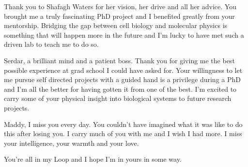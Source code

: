 Thank you to Shafagh Waters for her vision, her drive and all her advice. You brought me a truly fascinating PhD project and I benefited greatly from your mentorship. Bridging the gap between cell biology and molecular physics is something that will happen more in the future and I'm lucky to have met such a driven lab to teach me to do so. 

Serdar, a brilliant mind and a patient boss. Thank you for giving me the best possible experience at grad school I could have asked for. Your willingness to let me pursue self directed projects with a guided hand is a privilege during a PhD and I'm all the better for having gotten it from one of the best. I'm excited to carry some of your physical insight into biological systems to future research projects. 

Maddy, I miss you every day. You couldn't have imagined what it was like to do this after losing you. I carry much of you with me and I wish I had more. I miss your intelligence, your warmth and your love.

You're all in my Loop and I hope I'm in yours in some way.



